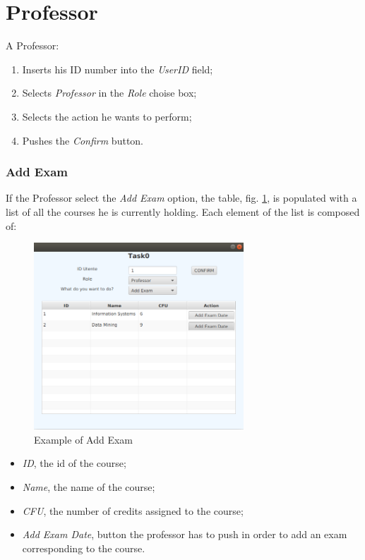 \documentclass{report}
\begin{document}
\section*{Professor}
A Professor:
\begin{enumerate}
	\item Inserts his ID number into the \textit{UserID} field;
	\item Selects \textsl{Professor} in the \textit{Role} choise box;
	\item Selects the action he wants to perform;
	\item Pushes the \textit{Confirm} button.
\end{enumerate}
\subsubsection*{Add Exam}
If the Professor select the \textit{Add Exam} option, the table, fig. \ref{fig:AddExam}, is populated with a list of all the courses he is currently holding. Each element of the list is composed of:
\begin{figure} [h!]
	\centering
	\includegraphics[width=0.7\textwidth]{AddExam.png}
	\caption{Example of Add Exam}
	\label{fig:AddExam}
\end{figure}
\begin{itemize}
	\item \textit{ID}, the id of the course;
	\item \textit{Name}, the name of the course;
	\item \textit{CFU}, the number of credits assigned to the course;
	\item \textit{Add Exam Date}, button the professor has to push in order to add an exam corresponding to the course. 
\end{itemize}
\end{document}
